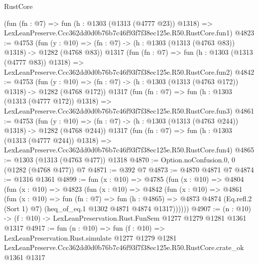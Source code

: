 \begin{lexlean}{RustCore}
\begin{coremodule}
    (fun (fn : @7) =>
    fun (h : @1303 (@1313 (@4777 @23)) @1318) =>
    LexLeanPreserve.Ccc362dd0d0b76b7c46f93f7f38ec125e.R50.RustCore.fun1)
@4823 := @4753
    (fun (y : @10) => (fn : @7) -> (h : @1303 (@1313 (@4763 @83)) @1318) -> @1282 (@4768 @83))
    @1317
    (fun (fn : @7) =>
    fun (h : @1303 (@1313 (@4777 @83)) @1318) =>
    LexLeanPreserve.Ccc362dd0d0b76b7c46f93f7f38ec125e.R50.RustCore.fun2)
@4842 := @4753
    (fun (y : @10) => (fn : @7) -> (h : @1303 (@1313 (@4763 @172)) @1318) -> @1282 (@4768 @172))
    @1317
    (fun (fn : @7) =>
    fun (h : @1303 (@1313 (@4777 @172)) @1318) =>
    LexLeanPreserve.Ccc362dd0d0b76b7c46f93f7f38ec125e.R50.RustCore.fun3)
@4861 := @4753
    (fun (y : @10) => (fn : @7) -> (h : @1303 (@1313 (@4763 @244)) @1318) -> @1282 (@4768 @244))
    @1317
    (fun (fn : @7) =>
    fun (h : @1303 (@1313 (@4777 @244)) @1318) =>
    LexLeanPreserve.Ccc362dd0d0b76b7c46f93f7f38ec125e.R50.RustCore.fun4)
@4865 := @1303 (@1313 (@4763 @477)) @1318
@4870 := Option.noConfusion.{0, 0} (@1282 (@4768 @477)) @7
@4871 := @392 @7
@4873 := @4870 @4871 @7
@4874 := @1316 @1361
@4899 := fun (x : @10) =>
  @4785
    (fun (x : @10) =>
    @4804
      (fun (x : @10) =>
      @4823
        (fun (x : @10) =>
        @4842
          (fun (x : @10) =>
          @4861
            (fun (x : @10) =>
            fun (fn : @7) =>
            fun (h : @4865) =>
            @4873 @4874 (Eq.refl.{2} (Sort 1) @7) (heq_of_eq.{1} @1302 @4871 @4874 @1317))))))
@4907 := (n : @10) -> (f : @10) -> LexLeanPreservation.Rust.FunSem @1277 @1279 @1281 @1361 @1317
@4917 := fun (n : @10) =>
  fun (f : @10) =>
  LexLeanPreservation.Rust.simulate
    @1277
    @1279
    @1281
    LexLeanPreserve.Ccc362dd0d0b76b7c46f93f7f38ec125e.R50.RustCore.crate_ok
    @1361
    @1317
\end{coremodule}
\end{lexlean}
